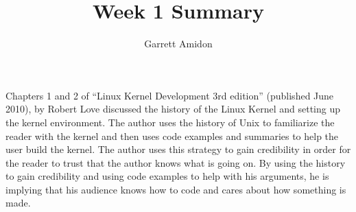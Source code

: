 \documentclass[a4paper]{article}
\title{Week 1 Summary}
\author{Garrett Amidon}
\begin{document}
\maketitle




\paragraph{}

Chapters 1 and 2 of “Linux Kernel Development 3rd edition” (published June 2010), by Robert Love discussed the history of the Linux Kernel and setting up the kernel environment. The author uses the history of Unix to familiarize the reader with the kernel and then uses code examples and summaries to help the user build the kernel. The author uses this strategy to gain credibility in order for the reader to trust that the author knows what is going on. By using the history to gain credibility and using code examples to help with his arguments, he is implying that his audience knows how to code and cares about how something is made.  
\end{document}
